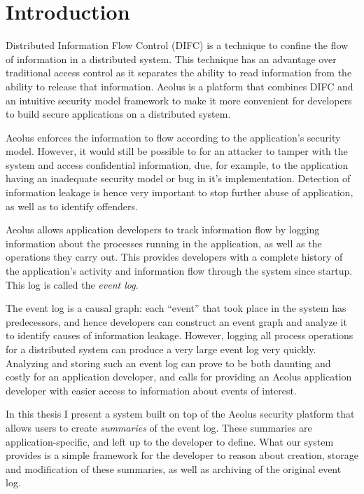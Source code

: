 \chapter{Introduction}

Distributed Information Flow Control (DIFC) is a technique to confine the flow of information in a distributed system. This technique has an advantage over traditional access control as it separates the ability to read information from the ability to release that information. Aeolus is a platform that combines DIFC and an intuitive security model framework to make it more convenient for developers to build secure applications on a distributed system.

Aeolus enforces the information to flow according to the application's security model. However, it would still be possible to for an attacker to tamper with the system and access confidential information, due, for example, to the application having an inadequate security model or bug in it's implementation. Detection of information leakage is hence very important to stop further abuse of application, as well as to identify offenders.

Aeolus allows application developers to track information flow by logging information about the processes running in the application, as well as the operations they carry out. This provides developers with a complete history of the application's activity and information flow through the system since startup. This log is called the \emph{event log}.

The event log is a causal graph: each ``event'' that took place in the system has predecessors, and hence developers can construct an event graph and analyze it to identify causes of information leakage. However, logging all process operations for a distributed system can produce a very large event log very quickly. Analyzing and storing such an event log can prove to be both daunting and costly for an application developer, and calls for providing an Aeolus application developer with easier access to information about events of interest.

In this thesis I present a system built on top of the Aeolus security platform that allows users to create \emph{summaries} of the event log. These summaries are application-specific, and left up to the developer to define. What our system provides is a simple framework for the developer to reason about creation, storage and modification of these summaries, as well as archiving of the original event log.

